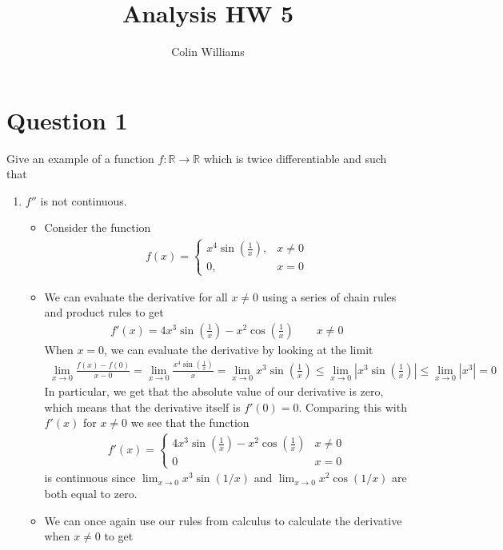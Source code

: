 \documentclass[10pt,a4paper]{article}
\title{Analysis HW 5}
\author{Colin Williams}
\theoremstyle{definition}
\theoremstyle{definition}
\numberwithin{equation}{section}
\begin{document}
\maketitle

\section*{Question 1}
Give an example of a function $f: \mathbb{R} \to \mathbb{R}$ which is twice differentiable and such that 
\begin{enumerate}[label = (\alph*)]
\item $f''$ is not continuous.
	\begin{itemize}
	\item Consider the function
	\begin{align*}
	f(x) = \begin{cases}
	x^4 \sin\left(\frac{1}{x}\right), & x \neq 0\\
	0, & x = 0
	\end{cases}
	\end{align*}
	\item We can evaluate the derivative for all $x \neq 0$ using a series of chain rules and product rules to get
	\begin{align*}
	f'(x) = 4x^3 \sin\left(\frac{1}{x}\right) - x^2 \cos\left(\frac{1}{x}\right) \qquad x \neq 0
	\end{align*}
	When $x = 0$, we can evaluate the derivative by looking at the limit
	\begin{align*}
	\lim_{x \to 0} \frac{f(x) - f(0)}{x - 0} = \lim_{x \to 0} \frac{x^4 \sin\left(\frac{1}{x}\right)}{x} = \lim_{x \to 0} x^3 \sin\left(\frac{1}{x}\right) \leq \lim_{x \to 0} \left| x^3 \sin\left(\frac{1}{x}\right)\right| \leq \lim_{x \to 0} |x^3| = 0
	\end{align*}
	In particular, we get that the absolute value of our derivative is zero, which means that the derivative itself is $f'(0) = 0$. Comparing this with $f'(x)$ for $x \neq 0$ we see that the function
	\begin{align*}
	f'(x) = \begin{cases}
	4x^3 \sin\left(\frac{1}{x}\right) - x^2 \cos\left(\frac{1}{x}\right) & x \neq 0\\
	0 & x =0
	\end{cases}
	\end{align*}
	is continuous since $\lim_{x \to 0} x^3 \sin(1/x)$ and $\lim_{x \to 0} x^2 \cos(1/x)$ are both equal to zero. 
	\item We can once again use our rules from calculus to calculate the derivative when $x \neq 0$ to get

\end{itemize}
\end{enumerate}
\end{document}
